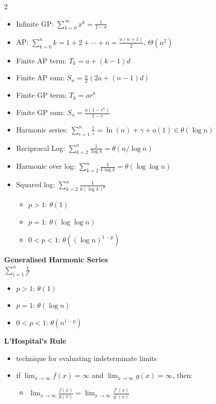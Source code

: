 \documentclass[10pt,landscape]{article}
\begin{document}
\begin{multicols*}{2}
\begin{itemize}
    \item Infinite GP: $\sum_{k=0}^{\infty} x^k = \frac{1}{1 - x}$
    \item AP: $\sum_{k=0}^{n} k = 1 + 2 + \cdots + n = \frac{n(n + 1)}{2}$, $\Theta(n^2)$
    \item Finite AP term: $T_k = a + (k-1)d$ 
    \item Finite AP sum: $S_n = \frac{n}{2}(2a + (n - 1)d)$
    \item Finite GP term: $T_k = ar^k$
    \item Finite GP sum: $S_n = \frac{a(1 -  r^n)}{1-r}$
    \item Harmonic series: $\sum_{i=1}^{n} \frac{1}{i} = \ln(n)+\gamma + o(1) \in \theta(\log n)$
    \item Reciprocal Log: $\sum_{k=2}^{n} \frac{1}{\log k} = \theta(n / \log n)$ 
    \item Harmonic over log: $\sum_{k=2}^{n} \frac{1}{k \log k} = \theta(\log \log n)$
    \item Squared log: $\sum_{k=2}^{n} \frac{1}{k(\log k)^p}$ 
    \begin{itemize}
        \item $p > 1$: $\theta (1)$
        \item $p = 1$: $\theta (\log \log n)$
        \item $0 < p < 1$: $\theta((\log n)^{1-p})$
    \end{itemize}
\end{itemize}
\vspace{8pt}
\textbf{Generalised Harmonic Series} \\
$\sum_{i=1}^{n} \frac{1}{i^p}$
\begin{itemize}
    \item $p > 1$: $\theta (1)$
    \item $p = 1$: $\theta (\log n)$
    \item $0 < p < 1$: $\theta(n^{1-p})$
\end{itemize}
\vspace{8pt}
\textbf{L'Hospital's Rule}
\begin{itemize}
    \item technique for evaluating indeterminate limits
    \item if $\lim_{x\to\infty} f(x) = \infty$ and $\lim_{x\to\infty} g(x) = \infty$, then:
    \begin{itemize}
        \item $\lim_{x\to\infty} \frac{f(x)}{g(x)} = \lim_{x\to\infty} \frac{f'(x)}{g'(x)}$
    \end{itemize}

\end{itemize}
\end{multicols*}
\end{document}
